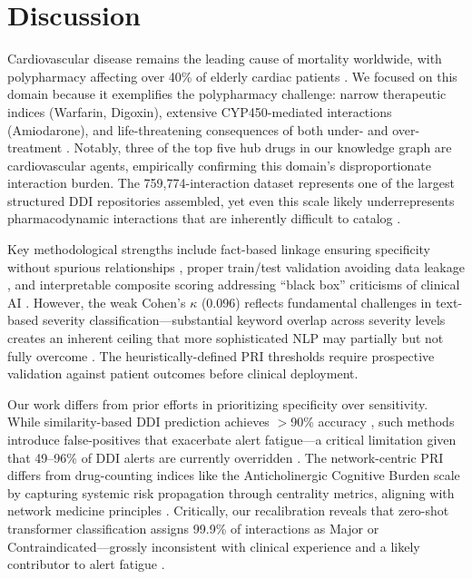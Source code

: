 \documentclass[11pt,a4paper]{article}
\begin{document}
\section*{Discussion}

Cardiovascular disease remains the leading cause of mortality worldwide, with polypharmacy affecting over 40\% of elderly cardiac patients \cite{january2019afib}. We focused on this domain because it exemplifies the polypharmacy challenge: narrow therapeutic indices (Warfarin, Digoxin), extensive CYP450-mediated interactions (Amiodarone), and life-threatening consequences of both under- and over-treatment \cite{steinberg2017off}. Notably, three of the top five hub drugs in our knowledge graph are cardiovascular agents, empirically confirming this domain's disproportionate interaction burden. The 759,774-interaction dataset represents one of the largest structured DDI repositories assembled, yet even this scale likely underrepresents pharmacodynamic interactions that are inherently difficult to catalog \cite{tatonetti2012data}.

Key methodological strengths include fact-based linkage ensuring specificity without spurious relationships \cite{han2022systematic}, proper train/test validation avoiding data leakage \cite{kapoor2023leakage}, and interpretable composite scoring addressing ``black box'' criticisms of clinical AI \cite{rudin2019stop}. However, the weak Cohen's $\kappa$ (0.096) reflects fundamental challenges in text-based severity classification---substantial keyword overlap across severity levels creates an inherent ceiling that more sophisticated NLP may partially but not fully overcome \cite{brown2020language}. The heuristically-defined PRI thresholds require prospective validation against patient outcomes before clinical deployment.

Our work differs from prior efforts in prioritizing specificity over sensitivity. While similarity-based DDI prediction achieves $>$90\% accuracy \cite{ryu2018deep, deng2020multimodal, chen2021transformer}, such methods introduce false-positives that exacerbate alert fatigue---a critical limitation given that 49--96\% of DDI alerts are currently overridden \cite{van2006override}. The network-centric PRI differs from drug-counting indices like the Anticholinergic Cognitive Burden scale \cite{campbell2009drug} by capturing systemic risk propagation through centrality metrics, aligning with network medicine principles \cite{barabasi2011network}. Critically, our recalibration reveals that zero-shot transformer classification assigns 99.9\% of interactions as Major or Contraindicated---grossly inconsistent with clinical experience and a likely contributor to alert fatigue \cite{phansalkar2013drug}.
\end{document}
